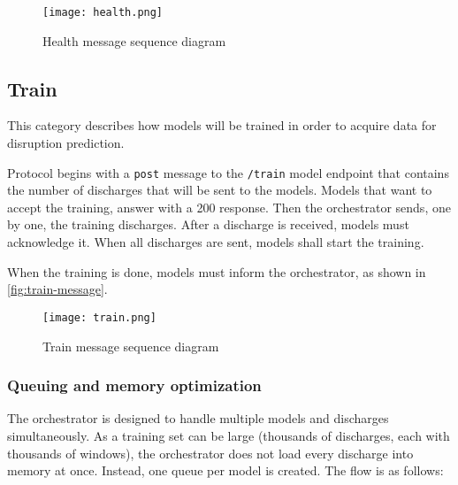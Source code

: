 \begin{figure}[H]
    \centering
    \texttt{[image: health.png]}
    \caption{Health message sequence diagram}
    \label{fig:health-message}
\end{figure}

\subsection{Train} 

This category describes how models will be trained in order to acquire data for disruption prediction. 

Protocol begins with a \texttt{post} message to the \texttt{/train} model endpoint that contains the number of discharges that will be sent to the models. Models that want to accept the training, answer with a 200 response. Then the orchestrator sends, one by one, the training discharges. After a discharge is received, models must acknowledge it. When all discharges are sent, models shall start the training.

When the training is done, models must inform the orchestrator, as shown in \autoref{fig:train-message}.

\begin{figure}[H]
    \centering
    \texttt{[image: train.png]}
    \caption{Train message sequence diagram}
    \label{fig:train-message}
\end{figure}

\subsubsection{Queuing and memory optimization}

The orchestrator is designed to handle multiple models and discharges simultaneously. As a training set can be large (thousands of discharges, each with thousands of windows), the orchestrator does not load every discharge into memory at once. Instead, one queue per model is created. The flow is as follows:


